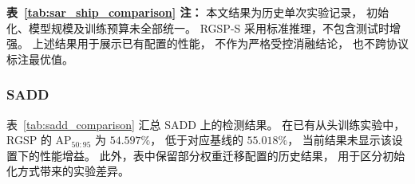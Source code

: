 \noindent
\smallskip
\begin{minipage}{\linewidth}
\footnotesize
\textbf{表~\ref{tab:sar_ship_comparison} 注：}
本文结果为历史单次实验记录，
初始化、模型规模及训练预算未全部统一。
RGSP-S 采用标准推理，不包含测试时增强。
上述结果用于展示已有配置的性能，
不作为严格受控消融结论，
也不跨协议标注最优值。
\end{minipage}
\endgroup
\FloatBarrier


\subsubsection{SADD}
\label{sec:sadd_results}

表~\ref{tab:sadd_comparison}
汇总 SADD 上的检测结果。
在已有从头训练实验中，
RGSP 的 AP$_{50:95}$ 为 $54.597\%$，
低于对应基线的 $55.018\%$，
当前结果未显示该设置下的性能增益。
此外，表中保留部分权重迁移配置的历史结果，
用于区分初始化方式带来的实验差异。

